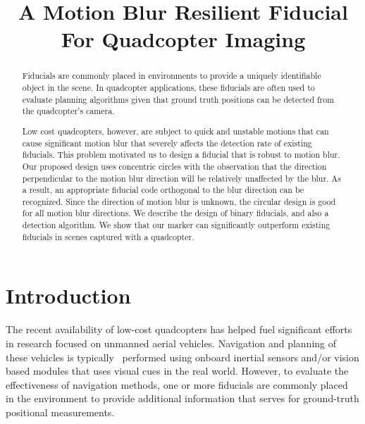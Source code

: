 \documentclass[10pt,twocolumn,letterpaper]{article}
\begin{document}
\title{A Motion Blur Resilient Fiducial For Quadcopter Imaging}
\maketitle

\begin{abstract}

  Fiducials are commonly placed in environments to provide a
  uniquely identifiable object in the scene.  In quadcopter
  applications, these fiducials are often used to evaluate planning
  algorithms given that ground truth positions can be
  detected from the quadcopter's camera. 

  Low cost quadcopters, however, are subject to quick and unstable
  motions that can cause significant motion blur that severely affects
  the detection rate of existing fiducials. This problem
  motivated us to design a fiducial that is robust to motion blur. Our
  proposed design uses concentric circles with the observation that
  the direction perpendicular to the motion blur direction will be
  relatively unaffected by the blur. As a result, an appropriate
  fiducial code orthogonal to the blur direction can be
  recognized. Since the direction of motion blur is unknown, the
  circular design is good for all motion blur directions. We describe
  the design of binary fiducials, and also a detection
  algorithm.  We show that our marker can significantly outperform
  existing fiducials in scenes captured with a quadcopter.

\end{abstract}

\section{Introduction}

The recent availability of low-cost quadcopters has helped  fuel
significant efforts in research focused on unmanned aerial
vehicles. Navigation and planning
of these vehicles is typically~\cite{Davison:2007,Engel12,Engel13}
performed using onboard inertial sensors and/or vision based modules
that uses visual cues in the real world. However, to evaluate the
effectiveness of navigation methods, one or more fiducials are commonly
placed~\cite{Bosnak:2012,Lim09,Klopschitz:2007}
 in the environment to provide additional information that
serves for ground-truth positional measurements.
\end{document}
